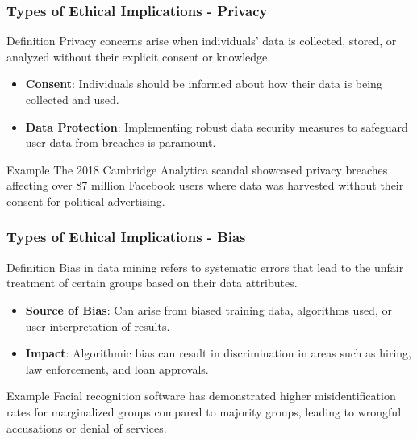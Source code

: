 \documentclass[aspectratio=169]{beamer}
\begin{document}
\begin{frame}[fragile]
    \frametitle{Types of Ethical Implications - Privacy}
    \begin{block}{Definition}
        Privacy concerns arise when individuals' data is collected, stored, or analyzed without their explicit consent or knowledge.
    \end{block}
    
    \begin{itemize}
        \item \textbf{Consent}: Individuals should be informed about how their data is being collected and used.
        \item \textbf{Data Protection}: Implementing robust data security measures to safeguard user data from breaches is paramount.
    \end{itemize}

    \begin{exampleblock}{Example}
        The 2018 Cambridge Analytica scandal showcased privacy breaches affecting over 87 million Facebook users where data was harvested without their consent for political advertising.
    \end{exampleblock}
\end{frame}

\begin{frame}[fragile]
    \frametitle{Types of Ethical Implications - Bias}
    \begin{block}{Definition}
        Bias in data mining refers to systematic errors that lead to the unfair treatment of certain groups based on their data attributes.
    \end{block}
    
    \begin{itemize}
        \item \textbf{Source of Bias}: Can arise from biased training data, algorithms used, or user interpretation of results.
        \item \textbf{Impact}: Algorithmic bias can result in discrimination in areas such as hiring, law enforcement, and loan approvals.
    \end{itemize}

    \begin{exampleblock}{Example}
        Facial recognition software has demonstrated higher misidentification rates for marginalized groups compared to majority groups, leading to wrongful accusations or denial of services.
    \end{exampleblock}
\end{frame}
\end{document}
